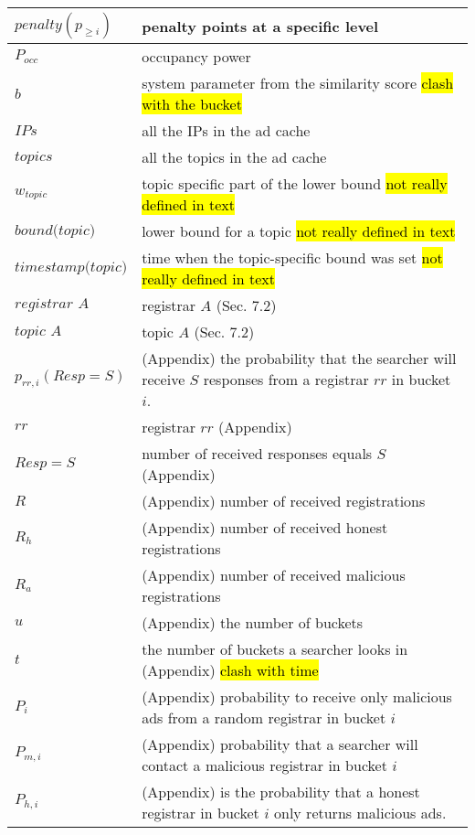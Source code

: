 \begin{table*}
\begin{center}
\begin{tabular}{ | l | p{16cm} |}
        $\textit{penalty}(p_{\geq i})$ & penalty points at a specific level \\ \hline
        $P_\textit{occ}$ & occupancy power \\ \hline
        $b$ & system parameter from the similarity score \hl{clash with the bucket} \\ \hline
        $\textit{IPs}$ & all the IPs in the ad cache \\ \hline
        $\textit{topics}$ & all the topics in the ad cache \\ \hline
        $w_\textit{topic}$ & topic specific part of the lower bound \hl{not really defined in text}\\ \hline
        $\textit{bound(topic)}$ & lower bound for a topic \hl{not really defined in text}\\ \hline
        $\textit{timestamp(topic)}$ & time when the topic-specific bound was set \hl{not really defined in text}\\ \hline
        $\textit{registrar A}$ & registrar $A$ (Sec. 7.2)\\ \hline
        $\textit{topic A}$& topic $A$ (Sec. 7.2)\\ \hline
        $p_{rr,i}(Resp=S)$ & (Appendix) the probability that the searcher will receive $S$ responses from a registrar $rr$ in bucket $i$. \\ \hline
        $rr$ & registrar $rr$ (Appendix) \\ \hline
        $Resp = S$ &  number of received responses equals $S$ (Appendix) \\ \hline
        $R$ & (Appendix) number of received registrations \\ \hline
        $R_h$ & (Appendix) number of received honest registrations \\ \hline
        $R_a$ & (Appendix) number of received malicious registrations \\ \hline
        $u$ & (Appendix) the number of buckets \\ \hline
        $t$ & the number of buckets a searcher looks in (Appendix) \hl{clash with time}\\ \hline
        $P_i$ & (Appendix) probability to receive only malicious ads from a random registrar in bucket $i$ \\ \hline
        $P_{m, i}$ & (Appendix) probability that a searcher will contact a malicious registrar in bucket $i$ \\ \hline
        $P_{h, i}$ & (Appendix) is the probability that a honest registrar in bucket $i$ only returns malicious ads. \\ \hline

\end{tabular}
\end{center}
\end{table*}
